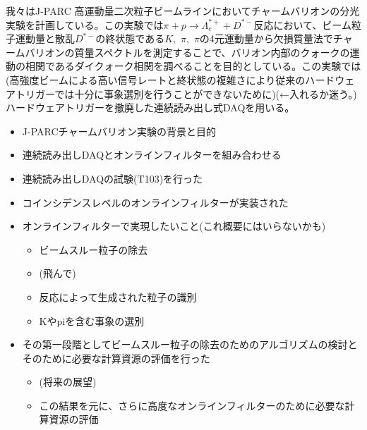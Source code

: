 \documentclass[12pt,a4paper,upLaTeX]{jsarticle}
\begin{document}
我々はJ-PARC 高運動量二次粒子ビームラインにおいてチャームバリオンの分光実験を計画している。この実験では$\pi+p\rightarrow\Lambda_c^{*+}+D^{*-}$反応において、ビーム粒子運動量と散乱$D^{*-}$の終状態である$K,\,\,\pi,\,\,\pi$の4元運動量から欠損質量法でチャームバリオンの質量スペクトルを測定することで、バリオン内部のクォークの運動の相関であるダイクォーク相関を調べることを目的としている。この実験では(高強度ビームによる高い信号レートと終状態の複雑さにより従来のハードウェアトリガーでは十分に事象選別を行うことができないために)(←入れるか迷う。)ハードウェアトリガーを撤廃した連続読み出し式DAQを用いる。
\begin{itemize}
  \item J-PARCチャームバリオン実験の背景と目的
  \item 連続読み出しDAQとオンラインフィルターを組み合わせる
  \item 連続読み出しDAQの試験(T103)を行った
  \item コインシデンスレベルのオンラインフィルターが実装された
  \item オンラインフィルターで実現したいこと(これ概要にはいらないかも)
  \begin{itemize}
    \item ビームスルー粒子の除去
    \item (飛んで)
    \item 反応によって生成された粒子の識別
    \item Kやpiを含む事象の選別
  \end{itemize}
  \item その第一段階としてビームスルー粒子の除去のためのアルゴリズムの検討とそのために必要な計算資源の評価を行った
  \begin{itemize}
    \item (将来の展望)
    \item この結果を元に、さらに高度なオンラインフィルターのために必要な計算資源の評価
  \end{itemize} 
\end{itemize}

\end{document}
